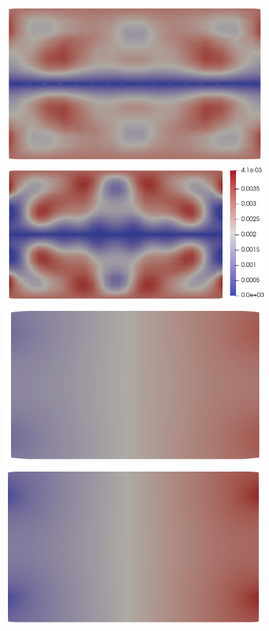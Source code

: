 \documentclass{article}
\begin{document}
\begin{figure}
\begin{minipage}{0.9\textwidth}
    \includegraphics[scale=0.27]{clip_B_T-1_lambda-1e-1_16-3-3.png}
    \includegraphics[scale=0.27]{clip_B_T-1_lambda-1e-1_32-3-4.png}
    \includegraphics[scale=0.27]{clip_ne_T-1_lambda-1e-1_8-2-2.png}
    \includegraphics[scale=0.27]{clip_ne_T-1_lambda-1e-1_16-3-3.png}

\end{minipage}
\end{figure}
\end{document}
